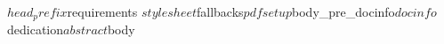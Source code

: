 $head_prefix$requirements
$stylesheet
$fallbacks$pdfsetup

$body_pre_docinfo$docinfo$dedication$abstract$body

